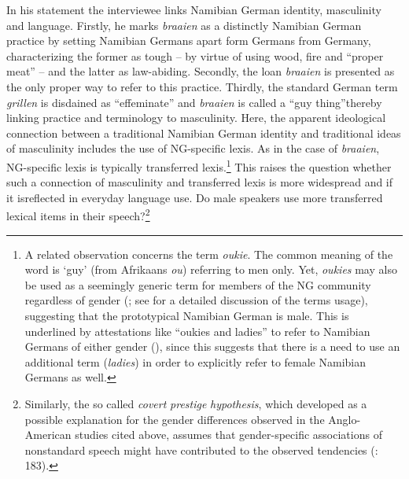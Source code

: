 \documentclass[output=paper]{langsci/langscibook}
\begin{document}
In his statement the interviewee links Namibian German identity, masculinity and language. Firstly, he marks \textit{braaien} as a distinctly Namibian German practice by setting Namibian Germans apart form Germans from Germany, characterizing the former as tough – by virtue of using wood, fire and “proper meat” – and the latter as law-abiding. Secondly, the loan \textit{braaien} is presented as the only proper way to refer to this practice. Thirdly, the standard German term \textit{grillen} is disdained as “effeminate” and \textit{braaien} is called a “guy thing”thereby linking practice and terminology to masculinity. Here, the apparent ideological connection between a traditional Namibian German identity and traditional ideas of masculinity includes the use of NG-specific lexis. As in the case of \textit{braaien}, NG-specific lexis is typically transferred lexis.\footnote{A related observation concerns the term \textit{oukie}. The common meaning of the word is ‘guy’ (from Afrikaans \textit{ou}) referring to men only. Yet, \textit{oukies} may also be used as a seemingly generic term for members of the NG community regardless of gender (\citealt{putz_dickschenarie_1982}; see  for a detailed discussion of the terms usage), suggesting that the prototypical Namibian German is male. This is underlined by attestations like “oukies and ladies” to refer to Namibian Germans of either gender (), since this suggests that there is a need to use an additional term (\textit{ladies}) in order to explicitly refer to female Namibian Germans as well.} This raises the question whether such a connection of masculinity and transferred lexis is more widespread and if it isreflected in everyday language use. Do male speakers use more transferred lexical items in their speech?\footnote{Similarly, the so called \textit{covert} \textit{prestige} \textit{hypothesis}, which \citet{trudgill_sex_1972} developed as a possible explanation for the gender differences observed in the Anglo-American studies cited above, assumes that gender-specific associations of nonstandard speech might have contributed to the observed tendencies (\citealt{trudgill_sex_1972}: 183).}%
\end{document}
